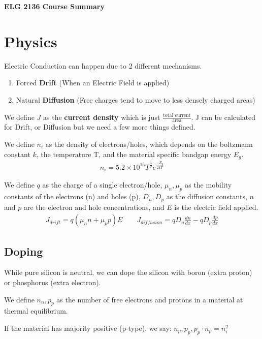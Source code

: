 \documentclass[12pt,letterpaper]{article} \usepackage{amsmath} \usepackage{graphicx} \usepackage[margin=1in]{geometry} \usepackage{longtable}  \usepackage{amssymb}
\begin{document}
	
	\begin{center}
		\Large\textbf{ELG 2136 Course Summary} \\
		\vspace{0.5em}
	\end{center}	

	\section{Physics}
	Electric Conduction can happen due to 2 different mechanisms. 
	\begin{enumerate}[]	
		\item Forced \textbf{Drift} (When an Electric Field is applied)
		\item Natural \textbf{Diffusion} (Free charges tend to move to less densely charged areas)
	\end{enumerate}

	We define \textbf{$J$} as the \textbf{current density} which is just $\frac{\text{total current}}{\text {area}}$. J can be calculated for Drift, or Diffusion but we need a few more things defined. 
	
	We define $n_i$ as the density of electrons/holes, which depends on the boltzmann constant $k$, the temperature T, and the material specific bandgap energy $E_g$. 
	\begin{align*}
		n_i = 5.2\times 10^{15} T^{\frac{3}{2}} e^\frac{-E_g}{2kT}
	\end{align*}

	We define $q$ as the charge of a single electron/hole, $\mu_n, \mu_p$ as the mobility constants of the electrons (n) and holes (p), $D_n, D_p$ as the diffusion constants, $n$ and $p$ are the electron and hole concentrations, and $E$ is the electric field applied.
	\begin{align*}
		J_{drift} = q(\mu_n n+ \mu_p p) E \qquad J_{diffusion} = qD_n \frac{dn}{dx} - qD_p \frac{dp}{dx}
	\end{align*} 

	\subsection{Doping}
	While pure silicon is neutral, we can dope the silicon with boron (extra proton) or phosphorus (extra electron).
	
	We define $n_n, p_p$ as the number of free electrons and protons in a material at thermal equilibrium.
	
	If the material has majority positive (p-type), we say: $n_p, p_p, p_p\cdot n_p = n_i^2$
	
\end{document}
